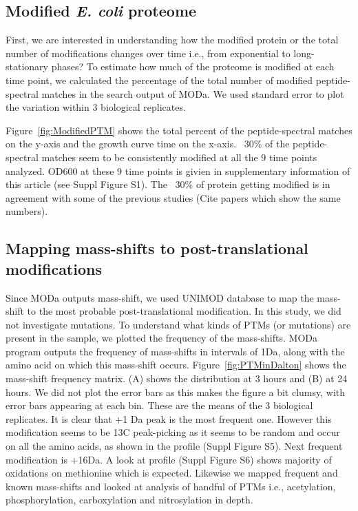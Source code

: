 \documentclass[12pt]{article}
\begin{document}
\subsection{Modified \emph{E. coli} proteome}
First, we are interested in understanding how the modified protein or the total number of modifications changes over time i.e., from exponential to long-stationary phases? To estimate how much of the proteome is modified at each time point, we calculated the percentage of the total number of modified peptide-spectral matches in the search output of MODa. We used standard error to plot the variation within 3 biological replicates.

Figure~\ref{fig:ModifiedPTM} shows the total percent of the peptide-spectral matches on the y-axis and the growth curve time on the x-axis. ~30\% of the peptide-spectral matches seem to be consistently modified at all the 9 time points analyzed. OD600 at these 9 time points is givien in supplementary information of this article (see Suppl Figure S1). The ~30\% of protein getting modified is in agreement with some of the previous studies (Cite papers which show the same numbers). 

\subsection{Mapping mass-shifts to post-translational modifications}
Since MODa outputs mass-shift, we used UNIMOD database to map the mass-shift to the most probable post-translational modification. In this study, we did not investigate mutations.
To understand what kinds of PTMs (or mutations) are present in the sample, we plotted the frequency of the mass-shifts. MODa program outputs the frequency of mass-shifts in intervals of 1Da, along with the amino acid on which this mass-shift occurs.
Figure~\ref{fig:PTMinDalton} shows the mass-shift frequency matrix. (A) shows the distribution at 3 hours and (B) at 24 hours. We did not plot the error bars as this makes the figure a bit clumsy, with error bars appearing at each bin. These are the means of the 3 biological replicates. It is clear that +1 Da peak is the most frequent one. However this modification seems to be 13C peak-picking as it seems to be random and occur on all the amino acids, as shown in the profile (Suppl Figure S5). Next frequent modification is +16Da. A look at profile (Suppl Figure S6) shows majority of oxidations on methionine which is expected. Likewise we mapped frequent and known mass-shifts and looked at analysis of handful of PTMs i.e., acetylation, phosphorylation, carboxylation and nitrosylation in depth.
\end{document}
